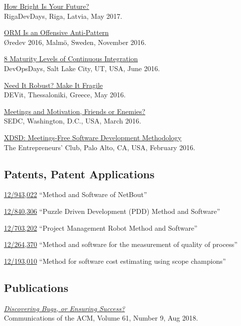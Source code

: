 \documentclass[12pt]{article}
\begin{document}
\href{https://www.youtube.com/watch?v=IGbteQpTNCA}{How Bright Is Your Future?}\\
RigaDevDays, Riga, Latvia, May 2017.

\href{https://www.youtube.com/watch?v=03PXmPc7Q3g}{ORM Is an Offensive Anti-Pattern}\\
\O{}redev 2016, Malm\"o, Sweden, November 2016.

\href{https://www.youtube.com/watch?v=3dJP_LtUGgg}{8 Maturity Levels of Continuous Integration}\\
DevOpsDays, Salt Lake City, UT, USA, June 2016.

\href{https://www.youtube.com/watch?v=nCGBgI1MNwE}{Need It Robust? Make It Fragile}\\
DEVit, Thessaloniki, Greece, May 2016.

\href{https://www.youtube.com/watch?v=LB_YLWhGrco}{Meetings and Motivation, Friends or Enemies?}\\
SEDC, Washington, D.C., USA, March 2016.

\href{https://www.youtube.com/watch?v=qRZYJGYdrwk}{XDSD: Meetings-Free Software Development Methodology}\\
The Entrepreneurs' Club, Palo Alto, CA, USA, February 2016.

\subsection*{Patents, Patent Applications}

\href{https://patents.google.com/patent/US20120117164}{12/943,022}
``Method and Software of NetBout''

\href{https://patents.google.com/patent/US20120023476}{12/840,306}
``Puzzle Driven Development (PDD) Method and Software''

\href{https://patents.google.com/patent/US20110196798}{12/703,202}
``Project Management Robot Method and Software''

\href{https://patents.google.com/patent/US20100114638}{12/264,370}
``Method and software for the measurement of quality of process''

\href{https://patents.google.com/patent/US20100042968}{12/193,010}
``Method for software cost estimating using scope champions''

\subsection*{Publications}

\emph{\href{https://www.yegor256.com/pdf/2018/discovering-bugs.pdf}{Discovering Bugs, or Ensuring Success?}}\\
Communications of the ACM, Volume 61, Number 9, Aug 2018.
\end{document}
